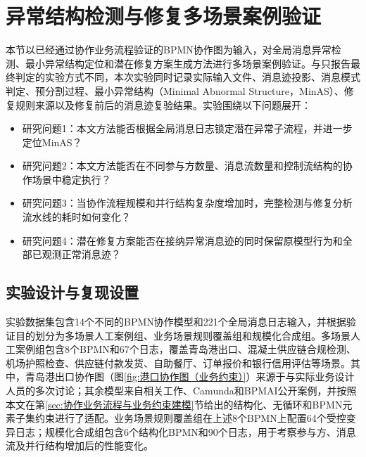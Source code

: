 
\section{异常结构检测与修复多场景案例验证}
\label{sec:异常结构检测与修复多场景案例验证}

本节以已经通过协作业务流程验证的BPMN协作图为输入，对全局消息异常检测、最小异常结构定位和潜在修复方案生成方法进行多场景案例验证。与只报告最终判定的实验方式不同，本次实验同时记录实际输入文件、消息迹投影、消息模式判定、预分割过程、最小异常结构（Minimal Abnormal Structure，MinAS）、修复规则来源以及修复前后的消息迹复验结果。实验围绕以下问题展开：

\begin{itemize}[nosep]
    \item 研究问题1：本文方法能否根据全局消息日志锁定潜在异常子流程，并进一步定位MinAS？
    \item 研究问题2：本文方法能否在不同参与方数量、消息流数量和控制流结构的协作场景中稳定执行？
    \item 研究问题3：当协作流程规模和并行结构复杂度增加时，完整检测与修复分析流水线的耗时如何变化？
    \item 研究问题4：潜在修复方案能否在接纳异常消息迹的同时保留原模型行为和全部已观测正常消息迹？
\end{itemize}

\subsection{实验设计与复现设置}

实验数据集包含14个不同的BPMN协作模型和221个全局消息日志输入，并根据验证目的划分为多场景人工案例组、业务场景规则覆盖组和规模化合成组。多场景人工案例组包含8个BPMN和67个日志，覆盖青岛港出口、混凝土供应链合规检测、机场护照检查、供应链付款发货、自助餐厅、订单报价和银行信用评估等场景。其中，青岛港出口协作图（图\ref{fig:港口协作图（业务约束）}）来源于与实际业务设计人员的多次讨论；其余模型来自相关工作、Camunda和BPMAI公开案例\cite{spalazzi2023blockchain,compagnucci2024study,camunda_bpmn_repository,bpmai_repository}，并按照本文在第\ref{sec:协作业务流程与业务约束建模}节给出的结构化、无循环和BPMN元素子集约束进行了适配。业务场景规则覆盖组在上述8个BPMN上配置64个受控变异日志；规模化合成组包含6个结构化BPMN和90个日志，用于考察参与方、消息流及并行结构增加后的性能变化。

